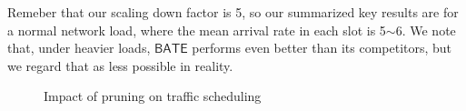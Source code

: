 \documentclass[sigconf]{acmart}
\begin{document}
Remeber that our scaling down factor is 5, so our summarized key results are for a normal network load, where the mean arrival rate in each slot is 5$\sim$6. 
We note that, under heavier loads, $\mathsf{BATE}$ performs even better than its competitors, 
but we regard that as less possible in reality.  


\begin{figure}
\centering
{}
\caption{Impact of pruning on traffic scheduling}
\label{availability_fig3}
\end{figure}

%
\end{document}
